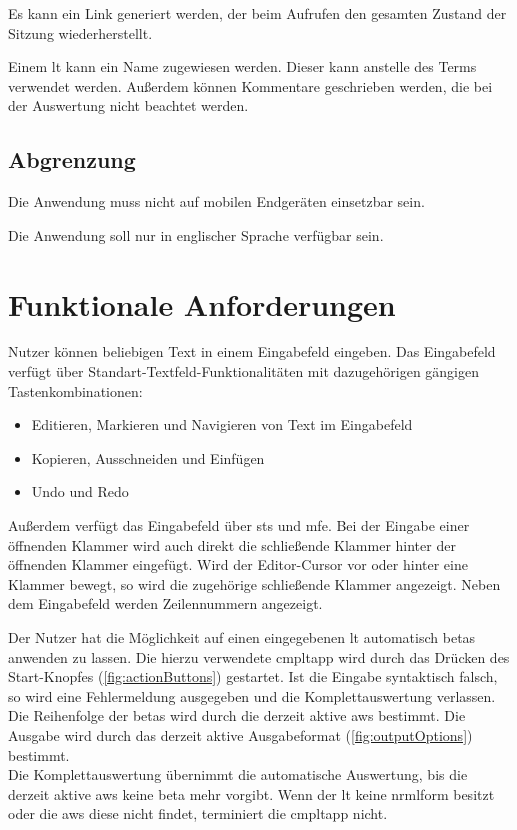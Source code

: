 \documentclass[parskip=full,11pt,twoside]{scrartcl}
\begin{document}
Es kann ein Link generiert werden, der beim Aufrufen den gesamten Zustand
der Sitzung wiederherstellt.

Einem \gls{lt} kann ein Name zugewiesen werden. Dieser kann anstelle des Terms
verwendet werden. Außerdem können Kommentare geschrieben werden, die bei der
Auswertung nicht beachtet werden.


\subsection{Abgrenzung}

Die Anwendung muss nicht auf mobilen Endgeräten einsetzbar sein.

Die Anwendung soll nur in englischer Sprache verfügbar sein.

\pagebreak

\section{Funktionale Anforderungen}

Nutzer können beliebigen Text in einem Eingabefeld eingeben. 
Das Eingabefeld verfügt über Standart-Textfeld-Funktionalitäten mit dazugehörigen gängigen Tastenkombinationen:
\begin{itemize}
	\item Editieren, Markieren und Navigieren von Text im Eingabefeld
	\item Kopieren, Ausschneiden und Einfügen
	\item Undo und Redo
\end{itemize}
Außerdem verfügt das Eingabefeld über \gls{st}s und \gls{mfe}.
Bei der Eingabe einer öffnenden Klammer wird auch direkt die schließende Klammer hinter der öffnenden Klammer eingefügt.
Wird der Editor-Cursor vor oder hinter eine Klammer bewegt, so wird die zugehörige schließende Klammer angezeigt.
Neben dem Eingabefeld werden Zeilennummern angezeigt.

Der Nutzer hat die Möglichkeit auf einen eingegebenen \gls{lt} automatisch \glspl{beta} anwenden zu lassen. 
Die hierzu verwendete \gls{cmpltapp} wird durch das Drücken des Start-Knopfes (\cref{fig:actionButtons}) gestartet.
Ist die Eingabe syntaktisch falsch, so wird eine Fehlermeldung ausgegeben und die Komplettauswertung verlassen.
Die Reihenfolge der \glspl{beta} wird durch die derzeit aktive \gls{aws} bestimmt. Die Ausgabe wird durch das derzeit aktive Ausgabeformat (\cref{fig:outputOptions}) bestimmt.\\
Die Komplettauswertung übernimmt die automatische Auswertung, bis die derzeit aktive \gls{aws} keine \gls{beta} mehr vorgibt.
Wenn der \gls{lt} keine \gls{nrmlform} besitzt oder die \gls{aws} diese nicht findet, terminiert die \gls{cmpltapp} nicht.
\end{document}
